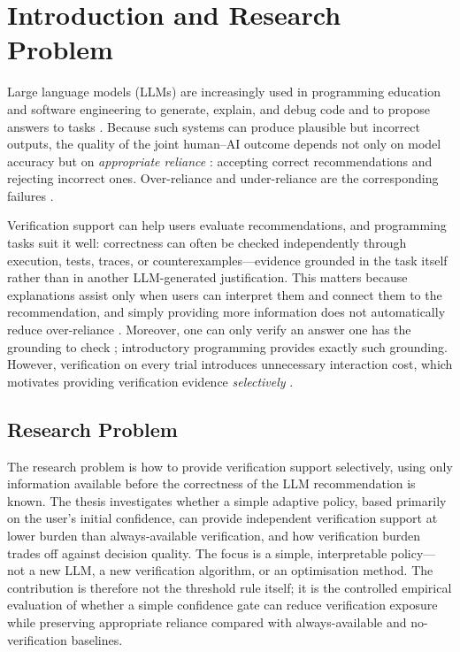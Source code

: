 \documentclass[oneside,final,14pt,a4paper]{extreport}
\begin{document}
\vspace{0.5em}
\endgroup

\section{Introduction and Research Problem}


Large language models (LLMs) are increasingly used in programming education
and software engineering to generate, explain, and debug code and to propose
answers to tasks \cite{Ma2024,Cambaz2024,Denny2024}. Because such systems can
produce plausible but incorrect outputs, the quality of the joint human--AI
outcome depends not only on model accuracy but on \emph{appropriate reliance}
\cite{LeeSee2004}: accepting correct recommendations and rejecting incorrect
ones. Over-reliance and under-reliance are the corresponding failures
\cite{PoursabziSangdeh2021,Vasconcelos2022}.


Verification support can help users evaluate recommendations, and programming
tasks suit it well: correctness can often be checked independently through
execution, tests, traces, or counterexamples---evidence grounded in the task
itself rather than in another LLM-generated justification. This matters
because explanations assist only when users can interpret them and connect
them to the recommendation, and simply providing more information does not
automatically reduce over-reliance
\cite{Bucinca2021,Vasconcelos2022,Bo2025,Schemmer2022}. Moreover, one can
only verify an answer one has the grounding to check \cite{Zhang2024Verify};
introductory programming provides exactly such grounding. However,
verification on every trial introduces unnecessary interaction cost, which
motivates providing verification evidence \emph{selectively}
\cite{CascadedLM2025}.


\subsection{Research Problem}

The research problem is how to provide verification support selectively, using
only information available before the correctness of the LLM recommendation is
known. The thesis investigates whether a simple adaptive policy, based
primarily on the user's initial confidence, can provide independent
verification support at lower burden than always-available verification, and
how verification burden trades off against decision quality. The focus is a
simple, interpretable policy---not a new LLM, a new verification algorithm, or
an optimisation method. The contribution is therefore not the threshold rule
itself; it is the controlled empirical evaluation of whether a simple
confidence gate can reduce verification exposure while preserving appropriate
reliance compared with always-available and no-verification baselines.
\end{document}
